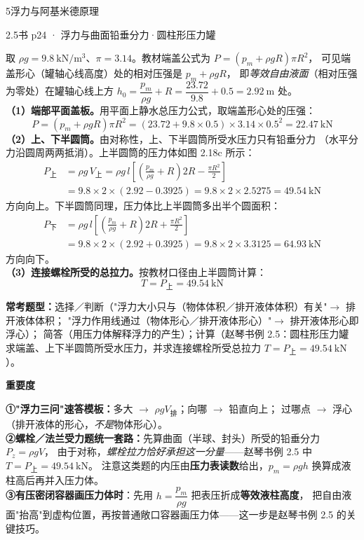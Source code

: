 \begin{kaodian}{5}{浮力与阿基米德原理}
\begin{liti}{2.5}{书 p24 · 浮力与曲面铅垂分力·圆柱形压力罐}
\begin{jie}
取 $\rho g=9.8\ \mathrm{kN/m^3}$、$\pi=3.14$。教材端盖公式为 $P=(p_m+\rho gR)\pi R^2$，
可见端盖形心（罐轴心线高度）处的相对压强是 $p_m+\rho gR$，
即\emph{等效自由液面}（相对压强为零处）在罐轴心线上方
$h_0=\dfrac{p_m}{\rho g}+R=\dfrac{23.72}{9.8}+0.5=2.92\ \mathrm{m}$ 处。\\
\textbf{（1）端部平面盖板。}用平面上静水总压力公式，取端盖形心处的压强：
\[ P=(p_m+\rho gR)\pi R^2=(23.72+9.8\times0.5)\times3.14\times0.5^2=22.47\ \mathrm{kN} \]
\textbf{（2）上、下半圆筒。}由对称性，上、下半圆筒所受水压力只有铅垂分力
（水平分力沿圆周两两抵消）。上半圆筒的压力体如图 2.18c 所示：
\[
\begin{aligned}
P_{\text{上}}&=\rho g\,V_{\text{上}}
   =\rho g\,l\left[\left(\frac{p_m}{\rho g}+R\right)2R-\frac{\pi R^2}{2}\right]\\
   &=9.8\times2\times(2.92-0.3925)=9.8\times2\times2.5275=49.54\ \mathrm{kN}
\end{aligned}
\]
方向向上。下半圆筒同理，压力体比上半圆筒多出半个圆面积：
\[
\begin{aligned}
P_{\text{下}}&=\rho g\,l\left[\left(\frac{p_m}{\rho g}+R\right)2R+\frac{\pi R^2}{2}\right]\\
   &=9.8\times2\times(2.92+0.3925)=9.8\times2\times3.3125=64.93\ \mathrm{kN}
\end{aligned}
\]
方向向下。\\
\textbf{（3）连接螺栓所受的总拉力。}按教材口径由上半圆筒计算：
\[ T=P_{\text{上}}=49.54\ \mathrm{kN} \]
\end{jie}
\end{liti}

\textbf{常考题型：}选择／判断（"浮力大小只与（物体体积／排开液体体积）有关"$\to$ 排开液体体积；
"浮力作用线通过（物体形心／排开液体形心）"$\to$ 排开液体形心即浮心）；
简答（用压力体解释浮力的产生）；计算（赵琴书例 2.5：圆柱形压力罐
求端盖、上下半圆筒所受水压力，并求连接螺栓所受总拉力 $T=P_{\text{上}}=49.54\ \mathrm{kN}$）。

\textbf{重要度 }\quad{}\quad{}

\begin{banfa}
\textbf{①"浮力三问"速答模板：}多大 $\to$ $\rho gV_{\text{排}}$；向哪 $\to$ 铅直向上；
过哪点 $\to$ 浮心（排开液体的形心，\emph{不是}物体形心）。\\
\textbf{②螺栓／法兰受力题统一套路：}先算曲面（半球、封头）所受的铅垂分力 $P_z=\rho gV$，
由于对称，\emph{螺栓拉力恰好承担这一分量}——赵琴书例 2.5 中 $T=P_{\text{上}}=49.54\ \mathrm{kN}$。
注意这类题的内压由\textbf{压力表读数}给出，$p_m=\rho g h$ 换算成液柱高后再并入压力体。\\
\textbf{③有压密闭容器画压力体时}：先用 $h=\dfrac{p_m}{\rho g}$ 把表压折成\textbf{等效液柱高度}，
把自由液面"抬高"到虚构位置，再按普通敞口容器画压力体——这一步是赵琴书例 2.5 的关键技巧。
\end{banfa}


\end{kaodian}
